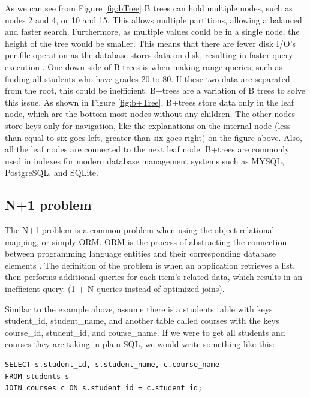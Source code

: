 As we can see from Figure \ref{fig:bTree} B trees can hold multiple nodes, such as nodes 2 and 4, or 10 and 15.
This allows multiple partitions, allowing a balanced and faster search.
Furthermore, as multiple values could be in a single node, the height of the tree would be smaller.
This means that there are fewer disk I/O’s per file operation as the database stores data on disk, resulting in faster query execution \cite{Garcia-Molina_Ullman_Widom_2014}.
One down side of B trees is when making range queries, such as finding all students who have grades 20 to 80.
If these two data are separated from the root, this could be inefficient. B+trees are a variation of B trees to solve this issue.
\bPlusTreeFigure
As shown in Figure \ref{fig:b+Tree}, B+trees store data only in the leaf node, which are the bottom most nodes without any children.
The other nodes store keys only for navigation, like the explanations on the internal node 
(less than equal to six goes left, greater than six goes right) on the figure above. Also, all the leaf nodes are connected to the next leaf node.
B+trees are commonly used in indexes for modern database management systems such as MYSQL, PostgreSQL, and SQLite. 

\subsection{N+1 problem}
\label{subsec:nplusone}

The N+1 problem is a common problem when using the object relational mapping, or simply ORM. 
ORM is the process of abstracting the connection between programming language entities and their corresponding database elements \cite{Amazon_Web_Services}.
The definition of the problem is when an application retrieves a list, then performs additional queries for each item’s related data, which results in an inefficient query. 
(1 + N queries instead of optimized joins).  

Similar to the example above, assume there is a students table with keys student\_id, student\_name, and another table called courses with the keys course\_id, student\_id, and course\_name. 
If we were to get all students and courses they are taking in plain SQL, we would write something like this:

\begin{verbatim}
SELECT s.student_id, s.student_name, c.course_name
FROM students s
JOIN courses c ON s.student_id = c.student_id;
\end{verbatim}

